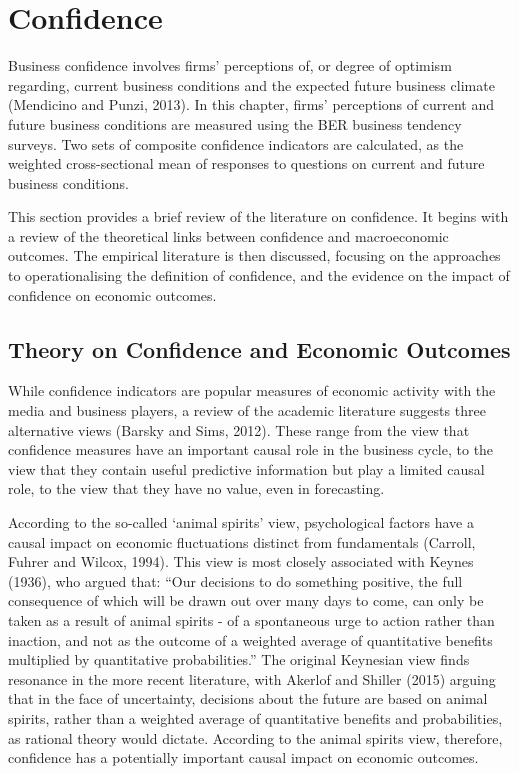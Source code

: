\documentclass[11pt,]{article}
\begin{document}
\section{Confidence}\label{confidence}

Business confidence involves firms' perceptions of, or degree of
optimism regarding, current business conditions and the expected future
business climate (Mendicino and Punzi, 2013). In this chapter, firms'
perceptions of current and future business conditions are measured using
the BER business tendency surveys. Two sets of composite confidence
indicators are calculated, as the weighted cross-sectional mean of
responses to questions on current and future business conditions.

This section provides a brief review of the literature on confidence. It
begins with a review of the theoretical links between confidence and
macroeconomic outcomes. The empirical literature is then discussed,
focusing on the approaches to operationalising the definition of
confidence, and the evidence on the impact of confidence on economic
outcomes.

\subsection{Theory on Confidence and Economic
Outcomes}\label{theory-on-confidence-and-economic-outcomes}

While confidence indicators are popular measures of economic activity
with the media and business players, a review of the academic literature
suggests three alternative views (Barsky and Sims, 2012). These range
from the view that confidence measures have an important causal role in
the business cycle, to the view that they contain useful predictive
information but play a limited causal role, to the view that they have
no value, even in forecasting.

According to the so-called `animal spirits' view, psychological factors
have a causal impact on economic fluctuations distinct from fundamentals
(Carroll, Fuhrer and Wilcox, 1994). This view is most closely associated
with Keynes (1936), who argued that: ``Our decisions to do something
positive, the full consequence of which will be drawn out over many days
to come, can only be taken as a result of animal spirits - of a
spontaneous urge to action rather than inaction, and not as the outcome
of a weighted average of quantitative benefits multiplied by
quantitative probabilities.'' The original Keynesian view finds
resonance in the more recent literature, with Akerlof and Shiller (2015)
arguing that in the face of uncertainty, decisions about the future are
based on animal spirits, rather than a weighted average of quantitative
benefits and probabilities, as rational theory would dictate. According
to the animal spirits view, therefore, confidence has a potentially
important causal impact on economic outcomes.
\end{document}
